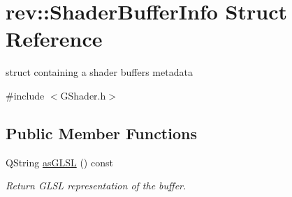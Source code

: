\hypertarget{structrev_1_1_shader_buffer_info}{}\section{rev\+::Shader\+Buffer\+Info Struct Reference}
\label{structrev_1_1_shader_buffer_info}


struct containing a shader buffer\textquotesingle{}s metadata  




{\ttfamily \#include $<$G\+Shader.\+h$>$}

\subsection*{Public Member Functions}
\begin{DoxyCompactItemize}
\item 
\mbox{\label{structrev_1_1_shader_buffer_info_a42688c308ef37ca4e8333380ffa1afd2}} 
Q\+String \mbox{\hyperlink{structrev_1_1_shader_buffer_info_a42688c308ef37ca4e8333380ffa1afd2}{as\+G\+L\+SL}} () const
\begin{DoxyCompactList}\small\item\em Return G\+L\+SL representation of the buffer. \end{DoxyCompactList}\end{DoxyCompactItemize}
